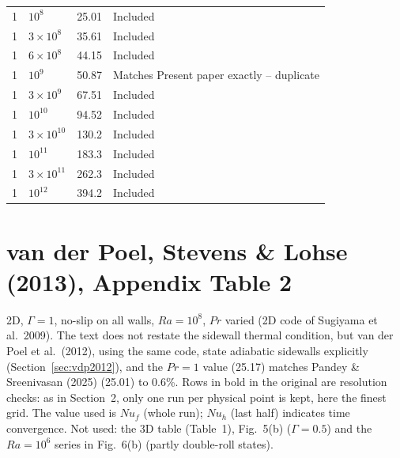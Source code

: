 \documentclass[11pt]{article}
\begin{document}
\begin{longtable}{l l l l}
\rowcolor{included} 1 & $10^{8}$ & 25.01 & Included \\
\rowcolor{included} 1 & $3\times10^{8}$ & 35.61 & Included \\
\rowcolor{included} 1 & $6\times10^{8}$ & 44.15 & Included \\
\rowcolor{excluded} 1 & $10^{9}$ & 50.87 & Matches Present paper exactly -- duplicate \\
\rowcolor{included} 1 & $3\times10^{9}$ & 67.51 & Included \\
\rowcolor{included} 1 & $10^{10}$ & 94.52 & Included \\
\rowcolor{included} 1 & $3\times10^{10}$ & 130.2 & Included \\
\rowcolor{included} 1 & $10^{11}$ & 183.3 & Included \\
\rowcolor{included} 1 & $3\times10^{11}$ & 262.3 & Included \\
\rowcolor{included} 1 & $10^{12}$ & 394.2 & Included \\
\end{longtable}
\section{van der Poel, Stevens \& Lohse (2013), Appendix Table 2}\label{sec:vdp2013}
2D, $\Gamma=1$, no-slip on all walls, $Ra=10^8$, $Pr$ varied
(2D code of Sugiyama et al.\ 2009). The text does not restate the sidewall
thermal condition, but van der Poel et al.\ (2012), using the same code,
state adiabatic sidewalls explicitly (Section~\ref{sec:vdp2012}), and the $Pr=1$ value (25.17) matches Pandey \& Sreenivasan (2025)
(25.01) to 0.6\%. Rows in bold in the original are resolution checks: as in
Section~2, only one run per physical point is kept, here the finest grid.
The value used is $Nu_f$ (whole run); $Nu_h$ (last half) indicates time
convergence. Not used: the 3D table (Table~1), Fig.~5(b) ($\Gamma=0.5$) and
the $Ra=10^6$ series in Fig.~6(b) (partly double-roll states).
\end{document}
